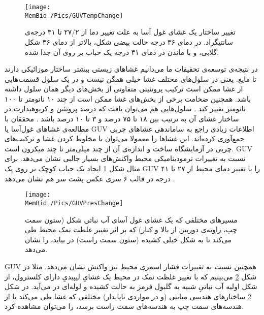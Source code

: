 \begin{figure}[h]
\begin{center}
\texttt{[image: \\MemBio /Pics/GUVTempChange]}
\caption{
تغییر ساختار یک غشای غول ‌آسا به علت تغییر دما از ۲۷/۲ تا ۴۱ درجه‌ی سانتیگراد. در دمای ۳۶ درجه حالت بیضی شکل، بالاتر از دمای ۳۶ شکل گلابی، و با ماندن در دمای ۴۱ درجه یک حباب بر روی آن جدا شده.
}
\label{fig:GUVTempChange}
\end{center}
\end{figure}
در نتیجه‌ی توسعه‌ی تحقیقات ما می‌دانیم غشا‌های زیستی بیشتر ساختار موزائیکی دارند تا مایع. یعنی در سلول‌های مختلف غشا خیلی همگن نیست و در یک سلول قسمت‌هایی از غشا ممکن است  ترکیب پروتئینی متفاوتی از بخش‌های دیگر همان سلول داشته باشد. همچنین ضخامت برخی از بخش‌های غشا ممکن است از چند ۱۰ نانومتر تا ۱۰۰ نانومتر تغییر کند
\cite{Engelman:2005aa}
. سلول‌هایی هم می‌توان یافت که درصد پروتئین و کربوهیدارت در ساختار غشای آن به ترتیب بین ۱۸ تا ۷۵ درصد و  ۳ تا ۱۰ درصد باشد
\cite{MembraneProteins1972}
. محققان با مطالعه‌ی غشا‌های غول‌آسا
 یا 
 GUV اطلاعات  زیادی راجع به ساماندهی غشاهای چربی جمع‌آوری کرده‌اند. این غشا‌ها را معمولا می‌توان با  مخلوط کردن 
 غشا‌ و ترکیب‌های چربی در آزمایشگاه ساخت
 \cite{GUVmaking2009}
و اندازه‌ی آن  از چند میلی‌متر تا چند میکرون  است. 
GUV نسبت به تغییرات ترمودینامیکی محیط واکنش‌های بسیار جالبی نشان می‌دهد. برای مثال شکل
\ref{fig:GUVTempChange}
ایجاد یک حباب کوچک بر روی یک GUV را با تغییر دمای محیط از ۲۷ تا ۴۱ درجه در قالب ۶ سری عکس پشت سر هم نشان می‌دهد
\cite{MemReviewRamakrishnan2014}.
 
\begin{figure}[h]
\begin{center}
\texttt{[image: \\MemBio /Pics/GUVPresChange]}
\caption{
مسیر‌های مختلفی که یک غشای غول آسای آب نباتی شکل (ستون سمت چپ، زاویه‌ی دوربین از بالا و کنار) که بر اثر تغییر غلظت نمک محیط طی می‌کند تا به شکل خیلی کشیده (ستون سمت راست) در بیاید، را نشان می‌دهد.
}
\label{fig:GUVPresChange}
\end{center}
\end{figure}

GUV همچنین نسبت به تغییرات فشار اسمزی محیط نیز واکنش نشان می‌دهد. مثلا در شکل 
\ref{fig:GUVPresChange}
می‌بینیم که با تغییر غلظت نمک در محیط یک غشایِ لیپیدیِ دارای کلسترول، از شکل اولیه آب نباتیِ 
شبیه‌ به گلبول قرمز به حالت کشیده و لوله‌ای در می‌آید. در شکل 
\ref{fig:GUVPresChange}
ساختار‌های هندسی میاینی (و در مواردی ناپایدار) مختلفی که غشا طی می‌کند تا از هندسه‌های سمت چپ به هندسه‌های سمت راست برسد، را می‌توان مشاهده کرد.
  
 
 
 
 
 
 
 
 
 
 